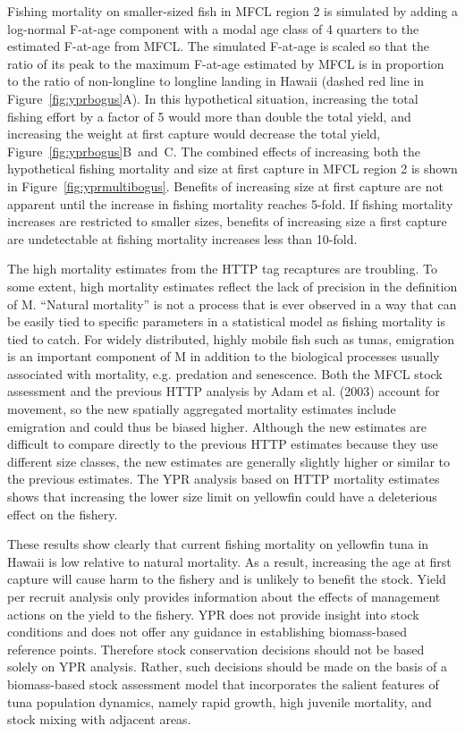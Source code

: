 \documentclass[12pt,letterpaper,twoside]{article}
\begin{document}
Fishing mortality on smaller-sized fish in MFCL region 2 is simulated
by adding a log-normal F-at-age component with a modal age class of 4
quarters to the estimated
F-at-age from MFCL. The simulated F-at-age is scaled so that the
ratio of its peak to the maximum F-at-age estimated by MFCL is in
proportion to the ratio of non-longline to longline landing in Hawaii
(dashed red line in Figure~\ref{fig:yprbogus}A). 
In this hypothetical situation, increasing the total
fishing effort by a factor of 5 would more than double the total
yield, and increasing the weight at first capture would decrease the
total yield, Figure~\ref{fig:yprbogus}B~and~C. 
The combined effects of increasing both the hypothetical fishing
mortality and size at first capture
in MFCL region 2 is shown in  Figure~\ref{fig:yprmultibogus}.
Benefits of increasing size at first capture are not apparent
until the increase in fishing mortality reaches 5-fold. 
If fishing mortality increases are restricted to
smaller sizes, benefits of increasing size a first capture are
undetectable at fishing mortality increases less than 10-fold.


The high mortality estimates from the HTTP tag recaptures are
troubling. To some extent, high mortality estimates reflect the
lack of precision in the definition of M. ``Natural mortality'' is not
a process that is ever observed in a way that can be easily tied to
specific parameters in a statistical model as fishing mortality is
tied to catch. 
For widely distributed, highly mobile fish such as tunas,
emigration is an important component of M in addition to the
biological processes usually associated with mortality, e.g. predation and
senescence. Both the MFCL stock assessment and the previous HTTP
analysis by Adam et al. (2003) account for movement, so the new
spatially aggregated mortality estimates include emigration and could
thus be biased higher.
Although the new estimates are difficult to compare directly to the
previous HTTP estimates because they use different size
classes, the new estimates are generally slightly higher or similar to
the previous estimates. 
The YPR analysis based on HTTP mortality estimates shows that
increasing the lower size limit on yellowfin could have a deleterious
effect on the fishery.

These results show clearly that current fishing mortality on yellowfin
tuna in Hawaii is low relative to natural mortality. As a result,
increasing the age at first capture will cause harm to the fishery and
is unlikely to benefit the stock.
Yield per recruit analysis only provides information about the effects
of management actions on the yield to the fishery. YPR does not
provide insight into stock conditions and does not offer any guidance
in establishing biomass-based reference points. Therefore stock conservation
decisions should not be based solely on YPR analysis. Rather, such
decisions should be made on the basis of a biomass-based stock
assessment model that incorporates the salient features of tuna
population dynamics, namely rapid growth, high juvenile mortality,
and stock mixing with adjacent areas.
\end{document}
